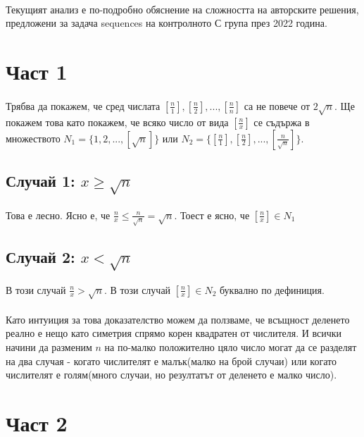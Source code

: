 \documentclass[12pt]{article}
\begin{document}
\paragraph*{}
Текущият анализ е по-подробно обяснение на сложността на авторските решения, предложени за задача sequences на контролното С група през 2022 година.

\section*{Част 1}
\paragraph*{}
Трябва да покажем, че сред числата $[\frac{n}{1}], [\frac{n}{2}], ..., [\frac{n}{n}]$ са не повече от $2 \sqrt{n}$. Ще покажем това като покажем, че всяко число от вида $[\frac{n}{x}]$ се съдържа в множеството $N_1 = \{1, 2, ..., [\sqrt{n}] \}$ или $N_2 = \{ [\frac{n}{1}], [\frac{n}{2}], ..., [\frac{n}{\sqrt{n}}] \}$.

\subsection*{Случай 1: $x \geq \sqrt{n}$}
\paragraph*{}
Това е лесно. Ясно е, че $\frac{n}{x} \leq \frac{n}{\sqrt{n}} = \sqrt{n}$. Тоест е ясно, че $[\frac{n}{x}] \in N_1$

\subsection*{Случай 2: $x < \sqrt{n}$}
В този случай $\frac{n}{x} > \sqrt{n}$. В този случай $[\frac{n}{x}] \in N_2$ буквално по дефиниция.

\paragraph*{}
Като интуиция за това доказателство можем да ползваме, че всъщност деленето реално е нещо като симетрия спрямо корен квадратен от числителя. И всички начини да разменим $n$ на по-малко положително цяло число могат да се разделят на два случая - когато числителят е малък(малко на брой случаи) или когато числителят е голям(много случаи, но резултатът от деленето е малко число).

\section*{Част 2}
\end{document}
